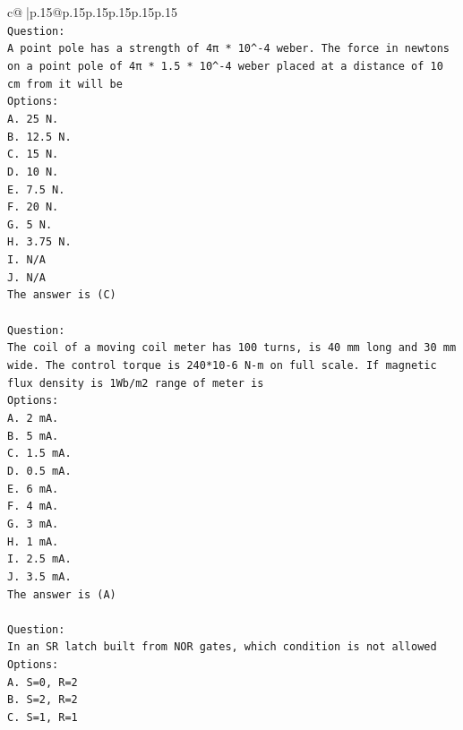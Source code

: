 \documentclass{article}
\begin{document}
{\begin{supertabular}{c@{$\;$}|p{.15\linewidth}@{}p{.15\linewidth}p{.15\linewidth}p{.15\linewidth}p{.15\linewidth}p{.15\linewidth}}
{{{\\ 
\texttt{Question:} \\
\texttt{A point pole has a strength of 4π * 10\^{}{-}4 weber. The force in newtons on a point pole of 4π * 1.5 * 10\^{}{-}4 weber placed at a distance of 10 cm from it will be} \\
\texttt{Options:} \\
\texttt{A. 25 N.} \\
\texttt{B. 12.5 N.} \\
\texttt{C. 15 N.} \\
\texttt{D. 10 N.} \\
\texttt{E. 7.5 N.} \\
\texttt{F. 20 N.} \\
\texttt{G. 5 N.} \\
\texttt{H. 3.75 N.} \\
\texttt{I. N/A} \\
\texttt{J. N/A} \\
\texttt{The answer is (C)} \\
\\ 
\texttt{Question:} \\
\texttt{The coil of a moving coil meter has 100 turns, is 40 mm long and 30 mm wide. The control torque is 240*10{-}6 N{-}m on full scale. If magnetic flux density is 1Wb/m2 range of meter is} \\
\texttt{Options:} \\
\texttt{A. 2 mA.} \\
\texttt{B. 5 mA.} \\
\texttt{C. 1.5 mA.} \\
\texttt{D. 0.5 mA.} \\
\texttt{E. 6 mA.} \\
\texttt{F. 4 mA.} \\
\texttt{G. 3 mA.} \\
\texttt{H. 1 mA.} \\
\texttt{I. 2.5 mA.} \\
\texttt{J. 3.5 mA.} \\
\texttt{The answer is (A)} \\
\\ 
\texttt{Question:} \\
\texttt{In an SR latch built from NOR gates, which condition is not allowed} \\
\texttt{Options:} \\
\texttt{A. S=0, R=2} \\
\texttt{B. S=2, R=2} \\
\texttt{C. S=1, R=1} \\
}}}
\end{supertabular}}
\end{document}
